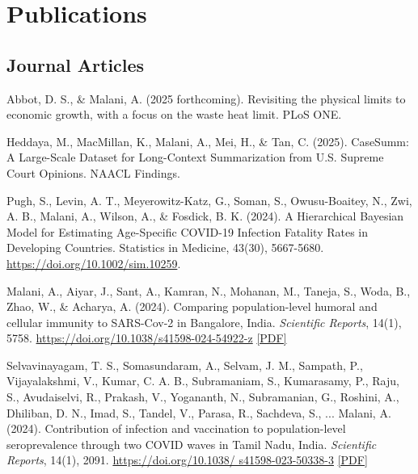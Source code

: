     \section*{Publications}

    \subsection*{Journal Articles}
    
    \begin{tablist}

        \item[2025] \tab{}Abbot, D. S., \& Malani, A. (2025 forthcoming). Revisiting the physical limits to economic growth, with a focus on the waste heat limit. PLoS ONE. 

        \item[2025] \tab{}Heddaya, M., MacMillan, K., Malani, A., Mei, H., \& Tan, C. (2025). CaseSumm: A Large-Scale Dataset for Long-Context Summarization from U.S. Supreme Court Opinions. NAACL Findings. 
        
        \item[2024] \tab{}Pugh, S., Levin, A. T., Meyerowitz-Katz, G., Soman, S., Owusu-Boaitey, N., Zwi, A. B., Malani, A., Wilson, A., \& Fosdick, B. K. (2024). A Hierarchical Bayesian Model for Estimating Age-Specific COVID-19 Infection Fatality Rates in Developing Countries. Statistics in Medicine, 43(30), 5667-5680. \href{https://doi.org/10.1002/sim.10259}{https://doi.org/10.1002/sim.10259}. 
        
        \item[2024] \tab{}Malani, A., Aiyar, J., Sant, A., Kamran, N., Mohanan, M., Taneja, S., Woda, B., Zhao, W., \& Acharya, A. (2024). Comparing population-level humoral and cellular immunity to SARS-Cov-2 in Bangalore, India. \textit{Scientific Reports}, 14(1), 5758. \href{https://doi.org/10.1038/s41598-024-54922-z}{https://doi.org/10.1038/s41598-024-54922-z} \href{https://github.com/anup-malani/website_personal/blob/main/publications/2024_MalaniEtAl_SciReports_CellullarImmunity.pdf}{[PDF]} 

        \item[2024] \tab{}Selvavinayagam, T. S., Somasundaram, A., Selvam, J. M., Sampath, P., Vijayalakshmi, V., Kumar, C. A. B., Subramaniam, S., Kumarasamy, P., Raju, S., Avudaiselvi, R., Prakash, V., Yogananth, N., Subramanian, G., Roshini, A., Dhiliban, D. N., Imad, S., Tandel, V., Parasa, R., Sachdeva, S., ... Malani, A. (2024). Contribution of infection and vaccination to population-level seroprevalence through two COVID waves in Tamil Nadu, India. \textit{Scientific Reports}, 14(1), 2091. \href{https://doi.org/10.1038/s41598-023-50338-3}{https://doi.org/10.1038/ s41598-023-50338-3} \href{https://github.com/anup-malani/website_personal/blob/main/publications/2024_SelvavinayagamMalaniEtAl_SciReports_TamilNaduSero.pdf}{[PDF]}
        

\end{tablist}
